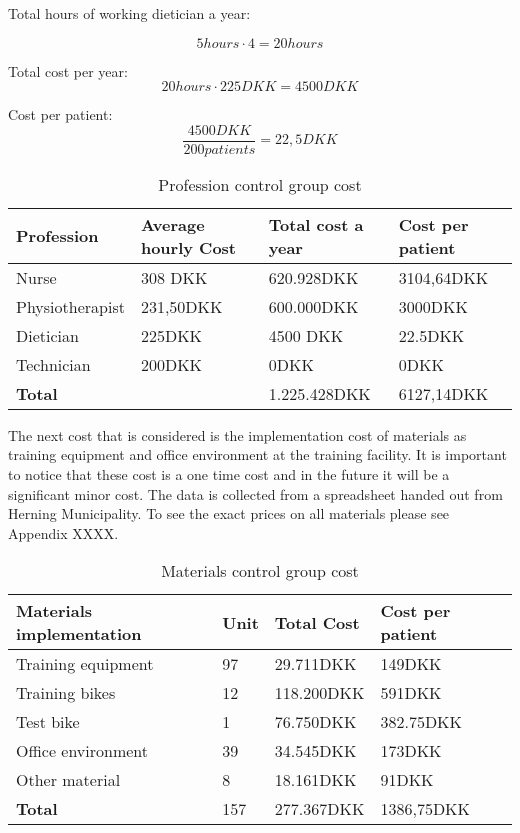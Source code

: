 Total hours of working dietician a year:

$$5hours\cdot4=20hours$$

Total cost per year:
$$20hours\cdot225DKK=4500DKK$$

Cost per patient:
$$\frac{4500DKK}{200patients}=22,5DKK$$

\begin{table}[H]
\begin{longtabu} to 
    \textbf{Profession} & \textbf{Average hourly Cost} & \textbf{Total cost a year} & \textbf{Cost per patient} \\[-1ex]
    \midrule
     Nurse   &    308 DKK & 620.928DKK & 3104,64DKK \\ \hline
    Physiotherapist   &   231,50DKK  & 600.000DKK & 3000DKK \\ \hline
    Dietician   &  225DKK &    4500 DKK    & 22.5DKK \\ \hline
    Technician & 200DKK & 0DKK & 0DKK\\
    \hline \hline \hline
    \textbf{Total} & & 1.225.428DKK & 6127,14DKK
    \newline
   \end{longtabu}
\caption{Profession control group cost}
\label{tab: PC}
\end{table}

The next cost that is considered is the implementation cost of materials as training equipment and office environment at the training facility. It is important to notice that these cost is a one time cost and in the future it will be a significant minor cost. The data is collected from a spreadsheet handed out from Herning Municipality. To see the exact prices on all materials please see Appendix XXXX. 

\begin{table}[H]
\begin{longtabu} to \linewidth{l l l l }
    \textbf{Materials implementation} & \textbf{Unit} &\textbf{Total Cost} & \textbf{Cost per patient} \\[-1ex]
    \midrule
    Training equipment   &  97 &  29.711DKK & 149DKK \\ \hline
    Training bikes   & 12 & 118.200DKK & 591DKK  \\ \hline
    Test bike    &  1 & 76.750DKK &   382.75DKK \\ \hline 
    Office environment    &  39 & 34.545DKK  &   173DKK  \\ \hline 
    Other material   &  8 & 18.161DKK  &   91DKK\\
    \hline \hline \hline
    \textbf{Total} & 157 & 277.367DKK & 1386,75DKK
    \newline
   \end{longtabu}
\caption{Materials control group cost}
\label{tab: MC}
\end{table}

